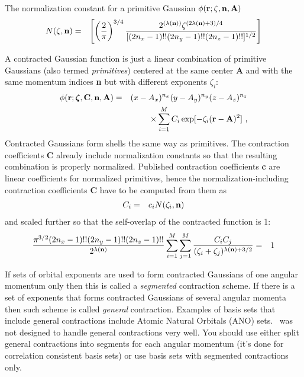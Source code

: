 \documentclass[12pt]{article}
\begin{document}
The normalization constant for a primitive Gaussian $\phi ({\bf r}; \zeta, {\bf n}, {\bf A})$
\begin{eqnarray}
N(\zeta,{\bf n}) & = & \left[ \left(\frac{2}{\pi}\right)^{3/4}\frac{2^{(\lambda({\bf n}))}\zeta^{(2\lambda({\bf n})+3)/4}}
                {[(2n_x-1)!!(2n_y-1)!!(2n_z-1)!!]^{1/2}} \right]
\end{eqnarray}

A contracted Gaussian function is just a linear combination of primitive Gaussians (also termed {\em primitives})
centered at the same center {\bf A} and with the same momentum indices {\bf n}
but with different exponents $\zeta_i$:
\begin{eqnarray}
\phi ({\bf r}; \bmath{\zeta}, {\bf C}, \n, {\bf A}) & = & (x - A_x)^{n_x} (y - A_y)^{n_y} (z - A_z)^{n_z} \nonumber \\
& & \times \sum_{i=1}^M C_i \exp [-\zeta_i ({\bf r}-{\bf A})^2]\ ,
\end{eqnarray}
Contracted Gaussians form shells the same way as primitives.
The contraction coefficients {\bf C} already include normalization constants so that the resulting combination
is properly normalized. Published contraction coefficients {\bf c} are linear coefficients for normalized primitives,
hence the normalization-including contraction coefficients {\bf C} have to be computed from them as
\begin{eqnarray} \label{eq:C1}
C_i & = & c_i N(\zeta_i,{\bf n})
\end{eqnarray}
and scaled further so that the self-overlap of the contracted function is 1:
\begin{eqnarray} \label{eq:C2}
\frac{\pi^{3/2} (2n_x-1)!!(2n_y-1)!!(2n_z-1)!!}{2^{\lambda({\bf n})}}
\sum_{i=1}^M \sum_{j=1}^M \frac{C_i C_j }{(\zeta_i+\zeta_j)^{\lambda({\bf n})+3/2}} & = & 1
\end{eqnarray}

If sets of orbital exponents are used to form contracted Gaussians of one angular momentum only
then this is called a {\em segmented} contraction scheme. If there is a set of exponents that forms
contracted Gaussians of several angular momenta then such scheme is called {\em general} contraction.
Examples of basis sets that include general contractions include Atomic Natural Orbitals (ANO) sets.
\LIBINT\ was not designed to handle general contractions very well. You should use either split general contractions
into segments for each angular momentum (it's done for correlation consistent basis sets)
or use basis sets with segmented contractions only.
\end{document}
